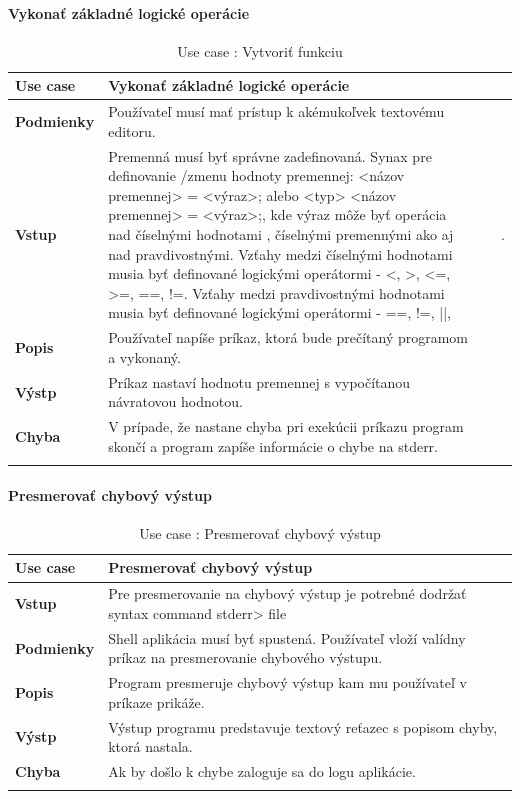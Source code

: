 \paragraph{Vykonať základné logické operácie}
\begin{center}
	\begin{longtable}{|p{2.5cm}|p{14cm}|}
		
			\hline
			\textbf{Use case} & Vykonať základné logické operácie\\ 
			\hline
			\textbf{Podmienky} & Používateľ musí mať prístup k akémukoľvek textovému editoru.  \\ 
			\hline
			\textbf{Vstup} & Premenná musí byť správne zadefinovaná. 
			Synax pre definovanie /zmenu hodnoty premennej:  
			<názov premennej> = <výraz>; alebo 
			<typ> <názov premennej> = <výraz>;, kde výraz môže byť operácia nad číselnými hodnotami , číselnými premennými ako aj nad pravdivostnými.
			Vzťahy medzi číselnými hodnotami musia byť definované logickými operátormi - <, >, <=, >=, ==, !=.
			Vzťahy medzi pravdivostnými hodnotami musia byť definované logickými operátormi - ==, !=, ||, &&.  \\
			\hline
			\textbf{Popis} & Používateľ napíše príkaz, ktorá bude prečítaný programom a vykonaný.\\ 
			\hline
			\textbf{Výstp} & Príkaz nastaví hodnotu premennej s vypočítanou návratovou hodnotou.\\
			\hline
			\textbf{Chyba} & V prípade, že nastane chyba pri exekúcii príkazu program skončí a program zapíše informácie o chybe na stderr.\\
			\hline
		\caption{Use case : Vytvoriť funkciu}
		\label{table:1}
		
	\end{longtable}
\end{center}

\paragraph{Presmerovať chybový výstup}
\begin{center}
	\begin{longtable}{|p{2.5cm}|p{14cm}|}
		
			\hline
			\textbf{Use case} & Presmerovať chybový výstup \\ 
			\hline
			\textbf{Vstup} & Pre presmerovanie na chybový výstup je potrebné dodržať syntax command stderr> file\\
			\hline
			\textbf{Podmienky} & Shell aplikácia musí byť spustená. Používateľ vloží valídny príkaz na presmerovanie chybového výstupu. \\ 
			\hline
			\textbf{Popis} & Program presmeruje chybový výstup kam mu používateľ v príkaze prikáže. \\ 
			\hline
			\textbf{Výstp} & Výstup programu predstavuje textový reťazec s popisom chyby, ktorá nastala.\\
			\hline
			\textbf{Chyba} & Ak by došlo k chybe zaloguje sa do logu aplikácie.\\
			\hline
		\caption{Use case : Presmerovať chybový výstup}
		\label{table:1}
		
	\end{longtable}
\end{center}
